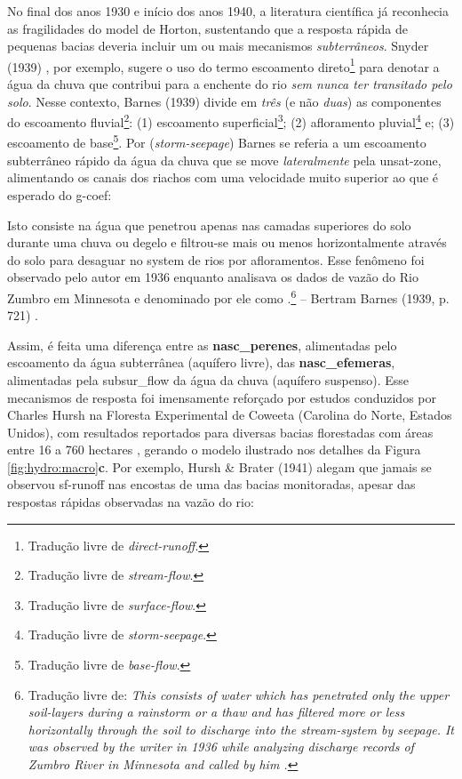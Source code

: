 \documentclass[./main.tex]{subfiles}
\begin{document}
\par No final dos anos 1930 e início dos anos 1940, a literatura científica já reconhecia as fragilidades do \gls{model} de Horton, sustentando que a resposta rápida de pequenas bacias deveria incluir um ou mais mecanismos \textit{subterrâneos}. Snyder (1939) \cite{Snyder1939}, por exemplo, sugere o uso do termo escoamento direto\footnote{Tradução livre de \textit{direct-runoff}.} para denotar a água da chuva que contribui para a enchente do rio \textit{sem nunca ter transitado pelo solo}. Nesse contexto, Barnes (1939) \cite{Barnes1939} divide em \textit{três} (e não \textit{duas}) as componentes do escoamento fluvial\footnote{Tradução livre de \textit{stream-flow}.}: (1) escoamento superficial\footnote{Tradução livre de \textit{surface-flow}.}; (2) afloramento pluvial\footnote{Tradução livre de \textit{storm-seepage}.} e; (3) escoamento de base\footnote{Tradução livre de \textit{base-flow}.}. Por  (\textit{storm-seepage}) Barnes se referia a um escoamento subterrâneo rápido da água da chuva que se move \textit{lateralmente} pela \gls{unsat-zone}, alimentando os canais dos riachos com uma velocidade muito superior ao que é esperado do \gls{g-coef}:

\begin{adjustwidth}{100pt}{0pt}
\medskip
\small Isto consiste na água que penetrou apenas nas camadas superiores do solo durante uma chuva ou degelo e filtrou-se mais ou menos horizontalmente através do solo para desaguar no \gls{system} de rios por afloramentos. Esse fenômeno foi observado pelo autor em 1936 enquanto analisava os dados de vazão do Rio Zumbro em Minnesota e denominado por ele como .\footnote{Tradução livre de: \textit{This consists of water which has penetrated only the upper soil-layers during a rainstorm or a thaw and has filtered more or less horizontally through the soil to discharge into the stream-system by seepage. It was observed by the writer in 1936 while analyzing discharge records of Zumbro River in Minnesota and called by him .}} -- Bertram Barnes (1939, p. 721) \cite{Barnes1939}.
\medskip
\end{adjustwidth}

\noindent Assim, é feita uma diferença entre as \textbf{\gls{nasc_perenes}}, alimentadas pelo escoamento da água subterrânea  (aquífero livre), das \textbf{\gls{nasc_efemeras}}, alimentadas pela \gls{subsur_flow} da água da chuva (aquífero suspenso). Esse mecanismos de resposta foi imensamente reforçado por estudos conduzidos por Charles Hursh na Floresta Experimental de Coweeta (Carolina do Norte, Estados Unidos), com resultados reportados para diversas bacias florestadas com áreas entre 16 a 760 hectares \cite{Hoover1943, Hursh1944}, gerando o modelo ilustrado nos detalhes da Figura \ref{fig:hydro:macro}\textbf{c}. Por exemplo, Hursh \& Brater (1941) \cite{Hursh1941} alegam que jamais se observou \gls{sf-runoff} nas encostas de uma das bacias monitoradas, apesar das respostas rápidas observadas na vazão do rio: 
\end{document}
